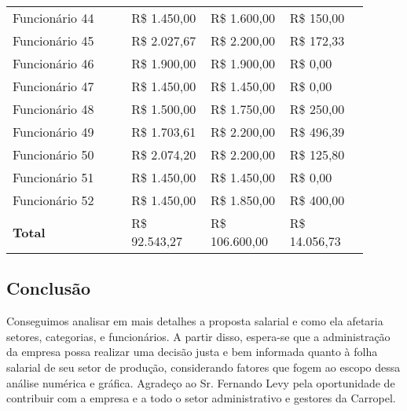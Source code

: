 \documentclass[a4paper, 12pt]{CSSullivanBusinessReport}
\begin{document}
\begin{fullwidth}
\begin{longtable}{|L{0.3\linewidth}|R{0.2\linewidth}|R{0.2\linewidth}|R{0.2\linewidth}|}
  Funcionário 44 & R\$ 1.450,00 & R\$ 1.600,00 & R\$  150,00 \\ 
  Funcionário 45 & R\$ 2.027,67 & R\$ 2.200,00 & R\$  172,33 \\ 
  Funcionário 46 & R\$ 1.900,00 & R\$ 1.900,00 & R\$    0,00 \\ 
  Funcionário 47 & R\$ 1.450,00 & R\$ 1.450,00 & R\$    0,00 \\ 
  Funcionário 48 & R\$ 1.500,00 & R\$ 1.750,00 & R\$  250,00 \\ 
  Funcionário 49 & R\$ 1.703,61 & R\$ 2.200,00 & R\$  496,39 \\ 
  Funcionário 50 & R\$ 2.074,20 & R\$ 2.200,00 & R\$  125,80 \\ 
  Funcionário 51 & R\$ 1.450,00 & R\$ 1.450,00 & R\$    0,00 \\ 
  Funcionário 52 & R\$ 1.450,00 & R\$ 1.850,00 & R\$  400,00 \\ 
\hline
\textbf{Total} & R\$ 92.543,27 & R\$ 106.600,00 & R\$ 14.056,73 \\
\hline
\end{longtable}	

\subsection{Conclusão}

Conseguimos analisar em mais detalhes a proposta salarial e como ela afetaria setores, categorias, e funcionários. A partir disso, espera-se que a administração da empresa possa realizar uma decisão justa e bem informada quanto à folha salarial de seu setor de produção, considerando fatores que fogem ao escopo dessa análise numérica e gráfica. Agradeço ao Sr. Fernando Levy pela oportunidade de contribuir com a empresa e a todo o setor administrativo e gestores da Carropel.

\end{fullwidth}
\end{document}
